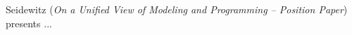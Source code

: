 

Seidewitz
\cite{isola-2016-seidewitz}
({\em On a Unified View of Modeling and Programming -- Position Paper})
presents ...

